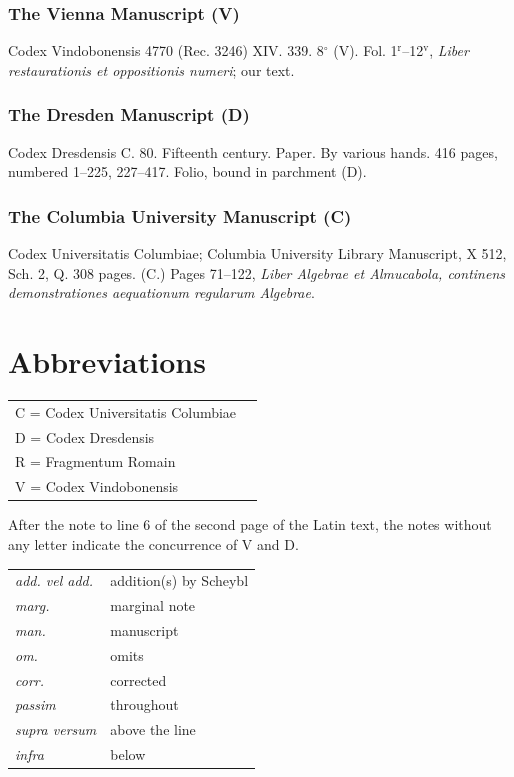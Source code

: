 \documentclass[11pt,a4paper]{book}
\begin{document}
\section{The Vienna Manuscript (V)}

Codex Vindobonensis 4770 (Rec. 3246) XIV. 339. 8$^\circ$ (V). Fol. 1$^\text{r}$--12$^\text{v}$, \textit{Liber restaurationis et oppositionis numeri}; our text.

\section{The Dresden Manuscript (D)}

Codex Dresdensis C. 80. Fifteenth century. Paper. By various hands. 416 pages, numbered 1--225, 227--417. Folio, bound in parchment (D).

\section{The Columbia University Manuscript (C)}

Codex Universitatis Columbiae; Columbia University Library Manuscript, X 512, Sch. 2, Q. 308 pages. (C.) Pages 71--122, \textit{Liber Algebrae et Almucabola, continens demonstrationes aequationum regularum Algebrae}.

\part*{Abbreviations}

\begin{longtable}{ll}
C = Codex Universitatis Columbiae \\
D = Codex Dresdensis \\
R = Fragmentum Romain \\
V = Codex Vindobonensis \\
\end{longtable}

After the note to line 6 of the second page of the Latin text, the notes without any letter indicate the concurrence of V and D.

\begin{longtable}{ll}
\textit{add. vel add.} & addition(s) by Scheybl \\
\textit{marg.} & marginal note \\
\textit{man.} & manuscript \\
\textit{om.} & omits \\
\textit{corr.} & corrected \\
\textit{passim} & throughout \\
\textit{supra versum} & above the line \\
\textit{infra} & below \\
\end{longtable}
\end{document}
